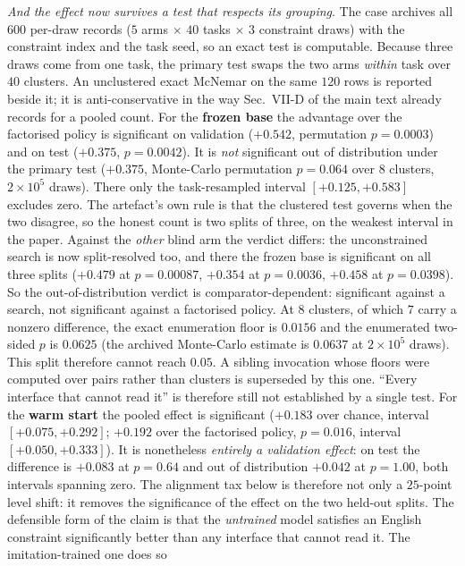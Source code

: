 \emph{And the effect now survives a test that respects its grouping}.  The case
archives all $600$ per-draw records ($5$ arms $\times$ $40$ tasks $\times$ $3$
constraint draws) with the constraint index and the task seed, so an exact test is computable.  Because three draws come from one task, the primary test swaps the two
arms \emph{within} task over $40$ clusters.  An unclustered exact McNemar on the same
$120$ rows is reported beside it; it is anti-conservative in the way
Sec.~VII-D of the main text already records for a pooled count. For the \textbf{frozen base} the advantage over the factorised policy is
significant on validation ($+0.542$, permutation $p=0.0003$) and on test ($+0.375$,
$p=0.0042$).  It is \emph{not} significant out of distribution under the primary test
($+0.375$, Monte-Carlo permutation $p=0.064$ over $8$ clusters, $2\times10^{5}$ draws).  There only the
task-resampled interval $[+0.125,+0.583]$ excludes zero.
The artefact's own rule is that the clustered test governs when the two disagree, so the honest count is
two splits of three, on the weakest interval in the paper.  Against the \emph{other} blind
arm the verdict differs: the unconstrained search is now split-resolved too, and there the
frozen base is significant on all three splits ($+0.479$ at $p=0.00087$, $+0.354$ at
$p=0.0036$, $+0.458$ at $p=0.0398$).  So the out-of-distribution verdict is comparator-dependent: significant against a
search, not significant against a factorised policy.  At $8$ clusters, of which $7$ carry a nonzero
difference, the exact enumeration floor is $0.0156$ and the enumerated two-sided
$p$ is $0.0625$ (the archived Monte-Carlo estimate is $0.0637$ at $2\times10^{5}$
draws). This split therefore cannot reach $0.05$. A sibling invocation whose floors were
computed over pairs rather than clusters is superseded by this one.  ``Every
interface that cannot read it'' is therefore still not established by a single test. For the \textbf{warm start} the pooled effect is significant ($+0.183$ over chance,
interval $[+0.075,+0.292]$; $+0.192$ over the factorised policy, $p=0.016$, interval
$[+0.050,+0.333]$).  It is nonetheless \emph{entirely a validation effect}: on test
the difference is $+0.083$ at $p=0.64$ and out of distribution $+0.042$ at $p=1.00$,
both intervals spanning zero. The alignment tax below is therefore not only a $25$-point level shift: it removes
the significance of the effect on the two held-out splits.  The defensible form of the
claim is that the \emph{untrained} model satisfies an English constraint significantly
better than any interface that cannot read it.  The imitation-trained one does so
